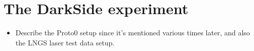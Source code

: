 \chapter{The DarkSide experiment}

\begin{itemize}
    
    \item Describe the Proto0 setup since it's mentioned various times later,
    and also the LNGS laser test data setup.

\end{itemize}
